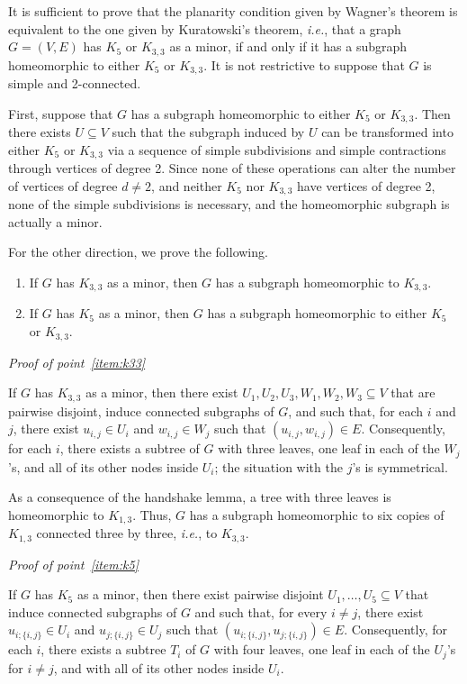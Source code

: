 \documentclass[12pt]{article}
\newcommand{\ie}{\textit{i.e.}}
\begin{document}
It is sufficient to prove that
the planarity condition given by Wagner's theorem
is equivalent to the one given by Kuratowski's theorem,
\ie, that a graph $G=(V,E)$
has $K_{5}$ or $K_{3,3}$ as a minor,
if and only if it has a subgraph
homeomorphic to either $K_{5}$ or $K_{3,3}$.
It is not restrictive to suppose that $G$ is simple and 2-connected.

First, suppose that $G$ has a subgraph
homeomorphic to either $K_{5}$ or $K_{3,3}$.
Then there exists $U\subseteq V$ such that the subgraph induced by $U$
can be transformed into either $K_{5}$ or $K_{3,3}$
via a sequence of simple subdivisions
and simple contractions through vertices of degree 2.
Since none of these operations
can alter the number of vertices of degree $d\neq 2$,
and neither $K_{5}$ nor $K_{3,3}$ have vertices of degree 2,
none of the simple subdivisions is necessary,
and the homeomorphic subgraph is actually a minor.

For the other direction, we prove the following.
\begin{enumerate}
\item \label{item:k33}
If $G$ has $K_{3,3}$ as a minor,
then $G$ has a subgraph homeomorphic to $K_{3,3}$.
\item \label{item:k5}
If $G$ has $K_{5}$ as a minor,
then $G$ has a subgraph homeomorphic to either $K_{5}$ or $K_{3,3}$.
\end{enumerate}

\textit{Proof of point~\ref{item:k33}}

If $G$ has $K_{3,3}$ as a minor,
then there exist $U_{1},U_{2},U_{3},W_{1},W_{2},W_{3}\subseteq V$
that are pairwise disjoint,
induce connected subgraphs of $G$,
and such that, for each $i$ and $j$,
there exist $u_{i,j}\in U_{i}$ and $w_{i,j}\in W_{j}$
such that $(u_{i,j},w_{i,j})\in E$.
Consequently, for each $i$, there exists a subtree of $G$ with three leaves,
one leaf in each of the $W_{j}$'s,
and all of its other nodes inside $U_{i}$;
the situation with the $j$'s is symmetrical.

As a consequence of the handshake lemma,
a tree with three leaves is homeomorphic to $K_{1,3}$.
Thus, $G$ has a subgraph homeomorphic to six copies of $K_{1,3}$
connected three by three,
\ie, to $K_{3,3}$.

\textit{Proof of point~\ref{item:k5}}

If $G$ has $K_{5}$ as a minor,
then there exist pairwise disjoint $U_{1},\ldots,U_{5}\subseteq V$
that induce connected subgraphs of $G$
and such that, for every $i\neq j$,
there exist $u_{i;\{i,j\}}\in U_{i}$ and $u_{j;\{i,j\}}\in U_{j}$
such that $(u_{i;\{i,j\}},u_{j;\{i,j\}})\in E$.
Consequently, for each $i$,
there exists a subtree $T_i$ of $G$ with four leaves,
one leaf in each of the $U_{j}$'s for $i\neq j$,
and with all of its other nodes inside $U_{i}$.
\end{document}
